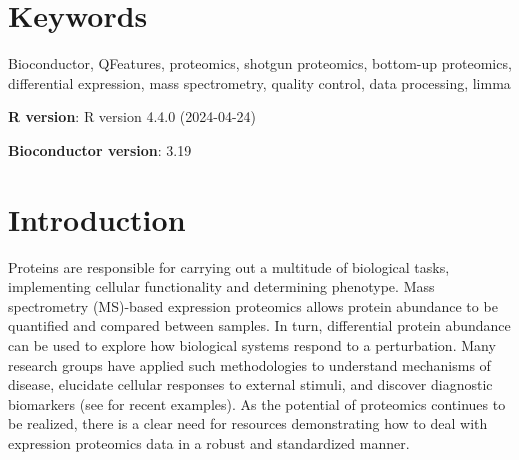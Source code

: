 \documentclass[9pt,a4paper,]{extarticle}
\begin{document}
\section*{Keywords}
Bioconductor, QFeatures, proteomics, shotgun proteomics, bottom-up proteomics,
differential expression, mass spectrometry, quality control, data processing,
limma


\clearpage
\pagestyle{main}

\textbf{R version}: R version 4.4.0 (2024-04-24)

\textbf{Bioconductor version}: 3.19

\section{Introduction}\label{introduction}

Proteins are responsible for carrying out a multitude of biological tasks,
implementing cellular functionality and determining phenotype. Mass spectrometry
(MS)-based expression proteomics allows protein abundance to be quantified and
compared between samples. In turn, differential protein abundance can be used to
explore how biological systems respond to a perturbation. Many research groups
have applied such methodologies to understand mechanisms of disease, elucidate
cellular responses to external stimuli, and discover diagnostic biomarkers (see
\citep{PinaJimnez2021, AmiriDashatan2021, Anitua2018} for recent examples). As the
potential of proteomics continues to be realized, there is a clear need for
resources demonstrating how to deal with expression proteomics data in a robust
and standardized manner.
\end{document}
